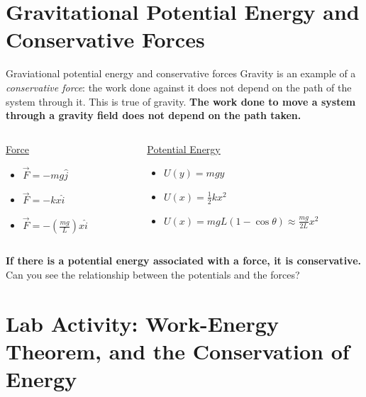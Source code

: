 \documentclass{beamer}
\begin{document}
\section{Gravitational Potential Energy and Conservative Forces}

\begin{frame}{Graviational potential energy and conservative forces}
Gravity is an example of a \textit{conservative force}: the work done against it does not depend on the path of the system through it.  This is true of gravity.  \textbf{The work done to move a system through a gravity field does not depend on the path taken.} \\ \vspace{1cm}
\begin{columns}[T]
\begin{column}{0.3\textwidth}
\centering
\underline{Force}
\begin{itemize}
\item $\vec{F} = -mg\hat{j}$
\item $\vec{F} = -kx\hat{i}$
\item $\vec{F} = -\left(\frac{mg}{L}\right)x\hat{i}$
\end{itemize}
\end{column}
\begin{column}{0.7\textwidth}
\centering
\underline{Potential Energy}
\begin{itemize}
\item $U(y) = mgy$
\item $U(x) = \frac{1}{2}kx^2$
\item $U(x) = mgL(1-\cos\theta) \approx \frac{mg}{2L}x^2$
\end{itemize}
\end{column}
\end{columns} \vspace{0.5cm}
\small
\textbf{If there is a potential energy associated with a force, it is conservative.}  Can you see the relationship between the potentials and the forces?
\end{frame}

\section{Lab Activity: Work-Energy Theorem, and the Conservation of Energy}
\end{document}
